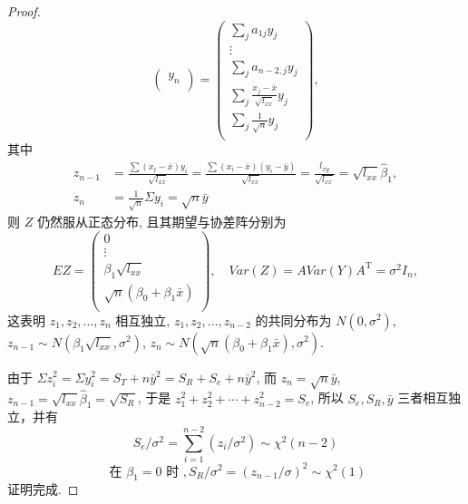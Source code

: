 \begin{proof}
\begin{equation*}
\begin{pmatrix}
y_n\\
\end{pmatrix}
=
\begin{pmatrix}
\sum_j{a}_{1j} y_{j}\\
\vdots\\
\displaystyle\sum_j{a}_{n-2, j} y_j\\
\displaystyle\sum_j{\frac{x_j-\bar{x}}{\sqrt{l_{xx}}}} y_j\\
\displaystyle\sum_j{\frac{1}{\sqrt{n}}} y_j\\
\end{pmatrix},
\end{equation*}
其中
\begin{equation*}
\begin{split}
z_{n-1} & = \frac{\sum(x_{t}-\bar{x}) y_{i}}{\sqrt{l_{x x}}} = 
\frac{\sum(x_{i}-\bar{x})(y_{i}-\bar{y})}{\sqrt{l_{x x}}} = 
\frac{l_{x y}}{\sqrt{l_{x x}}} =
\sqrt{l_{x x}} \hat{\beta}_{1}, \\ 
z_{n} & =\frac{1}{\sqrt{n}} \Sigma y_{i}=\sqrt{n} \bar{y}
\end{split}
\end{equation*}
则 ${Z}$ 仍然服从正态分布, 且其期望与协差阵分别为
\begin{equation*}
EZ = 
  \begin{pmatrix}
    0      \\
    \vdots \\
    \beta_{1}\sqrt{l_{xx}} \\
    \sqrt{n}(\beta_{0} + \beta_{1} \bar{x}) \\
  \end{pmatrix},
  \quad
  Var(Z) = A Var(Y) A^{\mathrm{T}} = \sigma^{2} I_{n}, 
\end{equation*}
这表明 $z_1, z_2, \ldots, z_n$ 相互独立, $z_1, z_2, \ldots, z_{n-2}$ 的共同分布为 $N(0, \sigma^2)$, $z_{n-1} \sim N(\beta_{1} \sqrt{l_{xx}}, \sigma^2)$, $z_{n} \sim N(\sqrt{n} (\beta_0 + \beta_{1} \bar{x}), \sigma^{2})$.

由于 $\Sigma z_{i}^{2} = \Sigma y_{i}^{2} = S_{T} + n \bar{y}^2 = S_{R} + S_{e} + n \bar{y}^2$, 而 $z_n = \sqrt{n} \bar{y}$, $z_{n-1} = \sqrt{l_{xx}}\hat{\beta}_{1} = \sqrt{S_{R}}$, 于是 $z_{1}^2 + z_{2}^2 + \cdots + z_{n-2}^2 = S_{e}$, 所以 $S_{e}, S_{R}, \bar{y}$ 三者相互独立，并有
\begin{equation*}
S_{e} / \sigma^{2}=\sum_{i=1}^{n-2}\left(z_{i} / \sigma^{2}\right) \sim \chi^{2}(n-2)
\end{equation*}
\begin{equation*}
\text{ 在 }\beta_{1}=0 \text { 时 }, S_{R} / \sigma^{2}=\left(z_{n-1} / \sigma\right)^{2} \sim \chi^{2}(1)
\end{equation*}
证明完成.
\end{proof}


